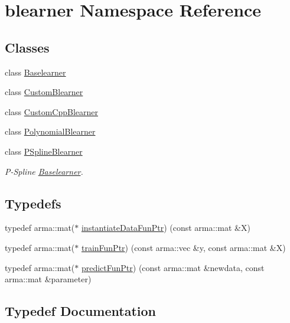 \hypertarget{namespaceblearner}{}\section{blearner Namespace Reference}
\label{namespaceblearner}
\subsection*{Classes}
\begin{DoxyCompactItemize}
\item 
class \hyperlink{classblearner_1_1_baselearner}{Baselearner}
\item 
class \hyperlink{classblearner_1_1_custom_blearner}{Custom\+Blearner}
\item 
class \hyperlink{classblearner_1_1_custom_cpp_blearner}{Custom\+Cpp\+Blearner}
\item 
class \hyperlink{classblearner_1_1_polynomial_blearner}{Polynomial\+Blearner}
\item 
class \hyperlink{classblearner_1_1_p_spline_blearner}{P\+Spline\+Blearner}
\begin{DoxyCompactList}\small\item\em P-\/\+Spline \hyperlink{classblearner_1_1_baselearner}{Baselearner}. \end{DoxyCompactList}\end{DoxyCompactItemize}
\subsection*{Typedefs}
\begin{DoxyCompactItemize}
\item 
typedef arma\+::mat($\ast$ \hyperlink{namespaceblearner_a10cec16134a934fb9defbdc2c2011f2a}{instantiate\+Data\+Fun\+Ptr}) (const arma\+::mat \&X)
\item 
typedef arma\+::mat($\ast$ \hyperlink{namespaceblearner_a5e2b38edf05e32681bee136af9ae505d}{train\+Fun\+Ptr}) (const arma\+::vec \&y, const arma\+::mat \&X)
\item 
typedef arma\+::mat($\ast$ \hyperlink{namespaceblearner_a93d5b51440d434704d2bde9dee652f6e}{predict\+Fun\+Ptr}) (const arma\+::mat \&newdata, const arma\+::mat \&parameter)
\end{DoxyCompactItemize}


\subsection{Typedef Documentation}
\mbox{\label{namespaceblearner_a10cec16134a934fb9defbdc2c2011f2a}} 
